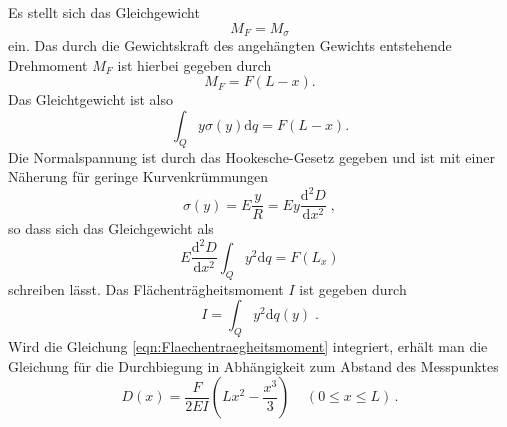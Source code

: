 Es stellt sich das Gleichgewicht
\begin{equation*}
  M_F=M_\sigma
\end{equation*}
ein. Das durch die Gewichtskraft des angehängten Gewichts entstehende Drehmoment
$M_F$ ist hierbei gegeben durch
\begin{equation*}
  M_F=F(L-x).
\end{equation*}
Das Gleichtgewicht ist also
\begin{equation}
  \int_Q y\sigma(y)\text{d}q=F(L-x).
\end{equation}
Die Normalspannung ist durch das Hookesche-Gesetz gegeben und ist mit einer Näherung
für geringe Kurvenkrümmungen
\begin{equation*}
  \sigma(y)=E\frac{y}{R}=Ey\frac{\text{d}^2D}{\text{d}x^2}\;,
\end{equation*}
so dass sich das Gleichgewicht als
\begin{equation*}
  E\frac{\text{d}^2D}{\text{d}x^2}\int_Q y^2\text{d}q=F(L_x)
\end{equation*}
schreiben lässt. Das Flächenträgheitsmoment $I$ ist gegeben durch
\begin{equation}
  I=\int_Q y^2 \text{d}q(y)\;.
  \label{eqn:Flaechentraegheitsmoment}
\end{equation}
Wird die Gleichung \eqref{eqn:Flaechentraegheitsmoment} integriert, erhält man die
Gleichung für die Durchbiegung in Abhängigkeit zum Abstand des Messpunktes
\begin{equation}
  D(x)=\frac{F}{2EI}\left(Lx^2-\frac{x^3}{3}\right)\;\;\;\;(0\le x \le L)\,.
  \label{eqn:durchbiegung1}
\end{equation}

